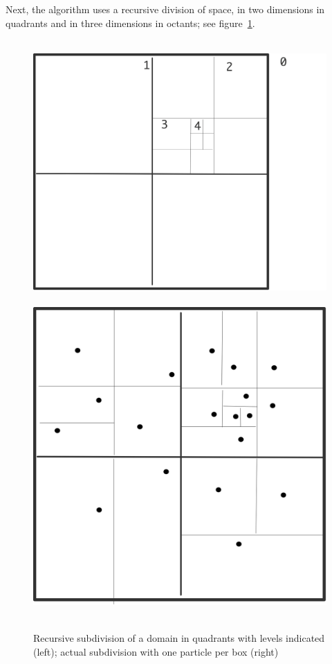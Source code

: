 Next, the algorithm uses a recursive division of space, in two
dimensions in quadrants and in three dimensions in octants; see
figure~\ref{fig:bh-quadrants}.
\begin{figure}[ht]
  \hbox{%
  \includegraphics[scale=.1]{graphics/bh-quadrants}
  \includegraphics[scale=.1]{graphics/bh-quadrants-filled}%
  }
  \caption{Recursive subdivision of a domain in quadrants with levels
    indicated (left); actual subdivision with one particle per box (right)}
  \label{fig:bh-quadrants}
\end{figure}

